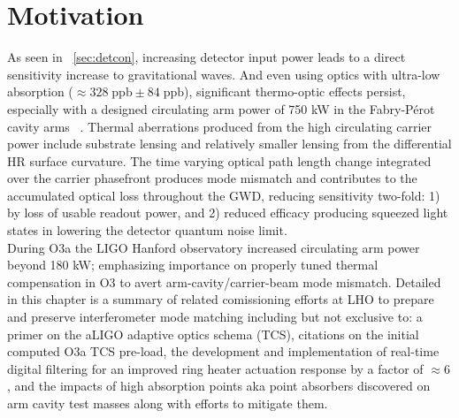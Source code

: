 




\section{Motivation}
As seen in ~\autoref{sec:detcon}, increasing detector input power leads to a direct sensitivity increase to gravitational waves. And even using optics with ultra-low absorption ($\approx 328 \; \mathrm{ppb} \pm 84 \; \mathrm{ppb}$), significant thermo-optic effects persist, especially with a designed circulating arm power of 750 kW in the Fabry-P\'{e}rot cavity arms ~\cite{tvo, aligo:2015}. Thermal aberrations produced from the high circulating carrier power include substrate lensing and relatively smaller lensing from the differential HR surface curvature. The time varying optical path length change integrated over the carrier phasefront produces mode mismatch and contributes to the accumulated optical loss throughout the GWD, reducing sensitivity two-fold: 1) by loss of usable readout power, and 2) reduced efficacy producing squeezed light states in lowering the detector quantum noise limit.
\\
During O3a the LIGO Hanford observatory increased circulating arm power beyond 180 kW; emphasizing importance on properly tuned thermal compensation in O3 to avert arm-cavity/carrier-beam mode mismatch. Detailed in this chapter is a summary of related comissioning efforts at LHO to prepare and preserve interferometer mode matching including but not exclusive to: a primer on the aLIGO adaptive optics schema (TCS), citations on the initial computed O3a TCS pre-load, the development and implementation of real-time digital filtering for an improved ring heater actuation response by a factor of $\approx 6$, and the impacts of high absorption points aka point absorbers discovered on arm cavity test masses along with efforts to mitigate them.

